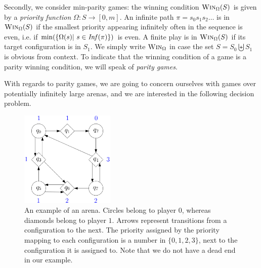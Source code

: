 \documentclass[a4paper,UKenglish,cleveref, autoref, thm-restate]{lipics-v2021}
\newcommand{\problemx}[3]{
	\vspace{0.2cm}
\par\noindent\underline{\sc#1}\par\nobreak\vskip.2\baselineskip
\begingroup\clubpenalty10000\widowpenalty10000
\setbox0\hbox{\bf INPUT:\ }\setbox1\hbox{\bf QUESTION:\ }
\dimen0=\wd0\ifnum\wd1>\dimen0\dimen0=\wd1\fi
\vskip-\parskip\noindent
\hbox to\dimen0{\box0\hfil}\hangindent\dimen0\hangafter1\ignorespaces#2\par
\vskip-\parskip\noindent
\hbox to\dimen0{\box1\hfil}\hangindent\dimen0\hangafter1\ignorespaces#3\par
\endgroup
	\vspace{-0.2cm}
}
\newcommand{\win}{\textsc{Win}}
\begin{document}
Secondly, we consider min-parity games: 
the winning condition $\win_\Omega(S)$ is given by a {\em priority function} 
 $\Omega : S \to  [0, m]$.
An infinite path $ \pi = s_0 s_1 s_2 \ldots$ is in $\win_\Omega(S)$ if the smallest priority appearing infinitely often in
the sequence 
 is even, i.e.
if $\min( \{ \Omega(s) | ~ s \in \text{\textit{Inf}}( \pi) \})$ is even. 
A finite play is in $\win_\Omega(S)$ if its target configuration is in $S_1$.
We simply write
$\win_\Omega$ in case the set $S = S_0 \biguplus S_1$ is obvious from context.
To indicate that the winning condition of a game is a parity winning condition, we will speak of
 {\em parity games}. 


With regards to parity games, we are going to concern ourselves with games over potentially infinitely large arenas, and we are interested in the following decision problem. 







\begin{center}
	\begin{figure}
			\hspace{3.81cm}
\includegraphics[width=0.4\textwidth]{figures/parity_game}
	\caption{An example of an arena. Circles  belong to player $0$, whereas diamonds belong to player $1$. Arrows represent transitions from a configuration to the next. The priority assigned by the priority mapping to each configuration is a number in $\{0,1,2,3\}$, next to the configuration it is assigned to. Note that we do not have a dead end in our example.}
	\label{example_parity_game}
	\end{figure}
\end{center}
\end{document}
